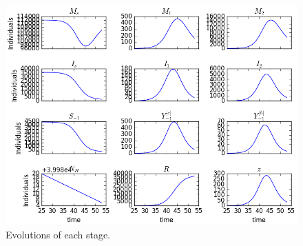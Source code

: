 \begin{figure}[htb]
	\centering
	\includegraphics[width=\textwidth, keepaspectratio]{populations_grid.png}
	\caption{Evolutions of each stage.}\label{fig:population_grid}
\end{figure}